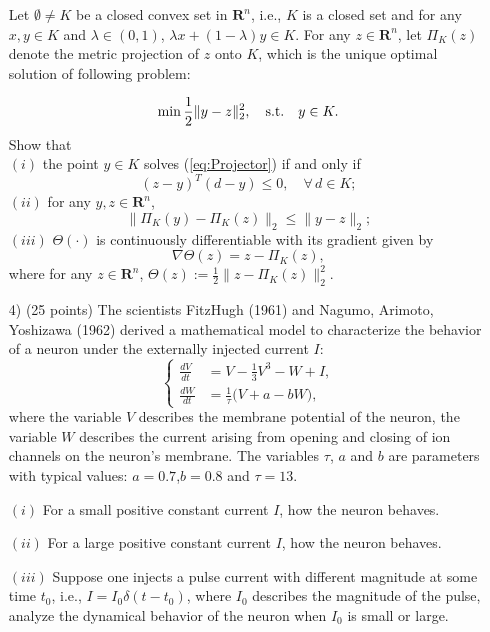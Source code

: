 \documentclass[10pt]{article}
\renewcommand{\leq}{\leqslant}
\newcommand{\thalf}{\textstyle{\frac{1}{2}}}
\begin{document}
\begin{enumerate}
Let $\emptyset\neq K$ be a closed convex set in $\mathbf{R}^n$, i.e., $K$ is a closed set and for any $x,y\in K$ and $\lambda\in (0,1)$, $\lambda x+(1-\lambda)y\in K$.
For any $z\in \mathbf{R}^n$, let $\Pi_{K}(z)$ denote the metric projection of $z$ onto $K$, which is the unique optimal solution of following problem:

\begin{equation}\label{eq:Projector}
\min \displaystyle \frac{1}{2}\|y-z\|_2^2,\quad{\rm s.t.}\quad  y\in K.
\end{equation}
Show that\\
$(i)$ the point $y\in K$ solves (\ref{eq:Projector}) if and only if
\begin{equation*}\label{eq:Projecterinequlity} (z-y)^T(d-y)   \leq 0, \quad \forall\, d\in K;
\end{equation*}
$(ii)$  for any $ y,z\in \mathbf{R}^n$,
$$
\|\Pi_{K}(y)-\Pi_{K}(z)\|_2\le \|y-z\|_2;
$$
$(iii)$ $\Theta(\cdot)$ is continuously differentiable with its gradient given by
\[\nabla \Theta(z)=z-\Pi_{K}(z),\]
where for any $z\in \mathbf{R}^n$,
$\Theta(z):=\thalf \|z-\Pi_{K}(z)\|_2^{2}$.

\item[4)](25 points) The scientists FitzHugh (1961) and Nagumo, Arimoto, Yoshizawa (1962) derived a mathematical model to characterize the behavior of a neuron under the externally injected current $I$:
\begin{equation*}
\begin{cases}
\frac{dV}{dt}&=V-\frac{1}{3}V^3-W+I,\\
\frac{dW}{dt}&=\frac{1}{\tau}\big(V+a-bW \big),
\end{cases}
\end{equation*}
where the variable $V$ describes the membrane potential of the neuron, the variable $W$ describes the current arising from opening and closing of ion channels on the neuron’s membrane. The variables $\tau$, $a$ and $b$ are parameters with typical values:  $a=0.7$,$b=0.8$ and $\tau=13$.

$(i)$ For a small positive constant current $I$, how the neuron
behaves.

$(ii)$ For a large positive constant current $I$, how the neuron
behaves.

$(iii)$ Suppose one injects a pulse current with different magnitude
at some time $t_0$, i.e., $I=I_0\delta(t-t_0)$, where $I_0$
describes the magnitude of the pulse, analyze the dynamical behavior
of the neuron when $I_0$ is small or large.






\end{enumerate}
\end{document}
